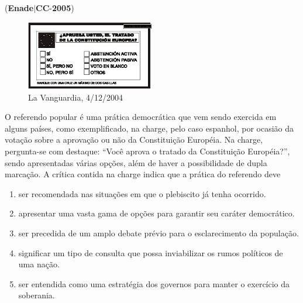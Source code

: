 \documentclass{exam}
\begin{document}
\begin{questions}
\question (\textbf{Enade}$|$\textbf{CC}-\textbf{2005}) \begin{figure}[H]
	\begin{center}
		\includegraphics[width=0.5\textwidth]{CIENCIA_DA_COMPUTACAO_Prova2005-utf8_figuras/fig-0005.jpg}
		\caption{La Vanguardia, 4/12/2004}
	\end{center}
\end{figure}
O referendo popular é uma prática democrática que vem sendo
exercida em alguns países, como exemplificado, na charge, pelo
caso espanhol, por ocasião da votação sobre a aprovação ou
não da Constituição Européia. Na charge, pergunta-se com
destaque: “Você aprova o tratado da Constituição Européia?”,
sendo apresentadas várias opções, além de haver a
possibilidade de dupla marcação.
A crítica contida na charge indica que a prática do referendo
deve
	\begin{enumerate}[label=\alph*)]
		\item  ser recomendada nas situações em que o plebiscito já tenha
ocorrido.
		\item  apresentar uma vasta gama de opções para garantir seu
caráter democrático.
		\item  ser precedida de um amplo debate prévio para o
esclarecimento da população.
		\item  significar um tipo de consulta que possa inviabilizar os
rumos políticos de uma nação.
		\item  ser entendida como uma estratégia dos governos para
manter o exercício da soberania.

	\end{enumerate}


\end{questions}
\end{document}
